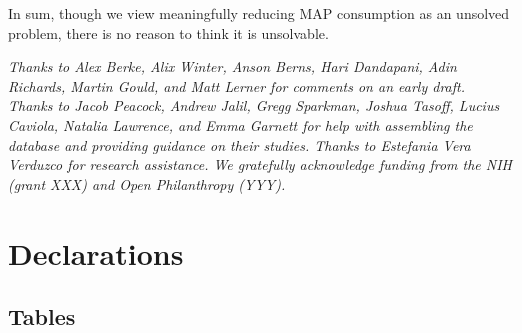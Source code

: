 \documentclass[sn-nature,referee,pdflatex]{sn-jnl}
\begin{document}
In sum, though we view meaningfully reducing MAP consumption as an
unsolved problem, there is no reason to think it is unsolvable.


\emph{Thanks to Alex Berke, Alix Winter, Anson Berns, Hari Dandapani,
Adin Richards, Martin Gould, and Matt Lerner for comments on an early
draft. Thanks to Jacob Peacock, Andrew Jalil, Gregg Sparkman, Joshua
Tasoff, Lucius Caviola, Natalia Lawrence, and Emma Garnett for help with
assembling the database and providing guidance on their studies. Thanks
to Estefania Vera Verduzco for research assistance. We gratefully
acknowledge funding from the NIH (grant XXX) and Open Philanthropy
(YYY).}

\section*{Declarations}\label{declarations}

\newpage

\subsection{Tables}\label{tables}
\end{document}
